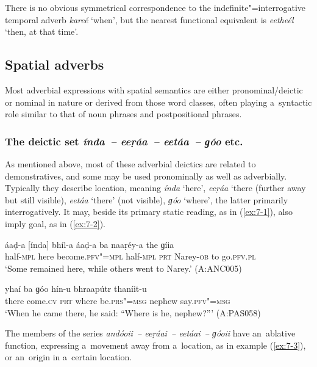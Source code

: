 There is no obvious symmetrical correspondence to the indefinite"=interrogative temporal adverb \textit{kareé} `when', but the nearest functional equivalent is \textit{eetheél} `then, at that time'. 

\subsection{Spatial adverbs}
\label{subsec:7-1-2}

Most adverbial expressions with spatial semantics are either pronominal/deictic or nominal in nature or derived from those word classes, often playing a~syntactic role similar to that of noun phrases and postpositional phrases.

\subsubsection*{The deictic set \textit{índa~-- eeṛáa~-- eetáa~-- ɡóo} etc.}

As mentioned above, most of these adverbial deictics are related to demonstratives, and some may be
used pronominally as well as adverbially. Typically they describe location, meaning
\textit{índa} `here', \textit{eeṛáa} `there (further away but still visible),
\textit{eetáa} `there' (not visible), \textit{ɡóo} `where', the latter primarily
interrogatively. It may, beside its primary static reading, as in (\ref{ex:7-1}), also imply goal, as in
(\ref{ex:7-2}).

\begin{exe}
\ex
\label{ex:7-1}
\gll áaḍ-a [índa] bhíl-a áaḍ-a ba naaṛéy-a  the ɡíia \\
half-\textsc{mpl} here become.\textsc{pfv"=mpl} half-\textsc{mpl} \textsc{prt} Narey-\textsc{ob}  to  go.\textsc{pfv.pl}  \\
\glt `Some remained here, while others went to Narey.' (A:ANC005)

\ex
\label{ex:7-2}
\gll [táa] yhaí ba ɡóo hín-u bhraapútr  thaníit-u \\
there come.\textsc{cv} \textsc{prt} where be.\textsc{prs"=msg} nephew  say.\textsc{pfv"=msg} \\
\glt `When he came there, he said: ``Where is he, nephew?''' (A:PAS058)
\end{exe}
The members of the series \textit{andóoii~-- eeṛáai~-- eetáai~-- ɡóoii} have an~ablative function,
expressing a~movement away from a~location, as in example (\ref{ex:7-3}), or an~origin in a~certain
location.

